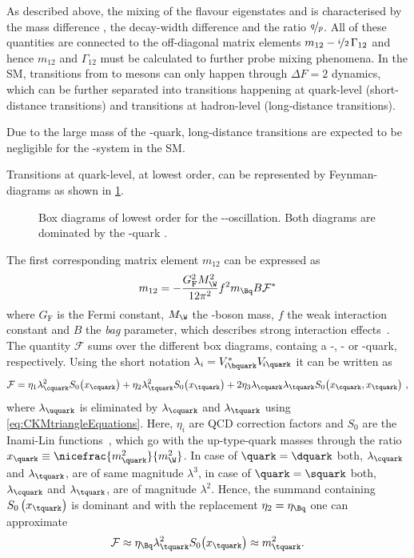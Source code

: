As described above, the mixing of the flavour eigenstates \Bq and \Bqb is characterised by the mass difference \dm, the decay-width difference \DG and the ratio $\nicefrac{q}{p}$.
All of these quantities are connected to the off-diagonal matrix elements $m_{12}-\nicefrac{i}{2}\,\Gamma_{12}$ and hence $m_{12}$ and $\Gamma_{12}$ must be calculated to further probe mixing phenomena.
In the \ac{SM}, transitions from \Bq to \Bqb mesons can only happen through $\Delta F=2$ dynamics, which can be further separated into transitions happening at quark-level (short-distance transitions) and transitions at hadron-level (long-distance transitions).

Due to the large mass of the \bquark-quark, long-distance transitions are expected to be negligible for the \Bq-\Bqb system in the \ac{SM}.

Transitions at quark-level, at lowest order, can be represented by Feynman-diagrams as shown in \cref{fig:FeynmanMixing}.
\begin{figure}[tbp]
	\centering
	
	\hspace{0.5cm}
	
	\caption{Box diagrams of lowest order for the \Bz-\Bzb-oscillation. Both diagrams are dominated by the \tquark-quark \cite{Ellis:2016jkw}.}
	\label{fig:FeynmanMixing}
\end{figure}
The first corresponding matrix element $m_{12}$ can be expressed as
\begin{equation}
m_{12}=-\frac{G_{\text{F}}^2M_\W^2}{12\pi^2}f^2m_{\Bq}B\mathcal{F}^\ast \label{eq:monetwo}
\end{equation}
where $G_{\text{F}}$ is the Fermi constant, $M_\W$ the \W-boson mass, $f$ the weak interaction constant and $B$ the \emph{bag} parameter, which describes strong interaction effects~\cite{Branco:396964}.
The quantity $\mathcal{F}$ sums over the different box diagrams, containg a \uquark-, \cquark- or \tquark-quark, respectively.
Using the short notation $\lambda_i=V^{*}_{{\kern -0.1em}i\bquark}V_{{\kern -0.1em}i\quark}$ it can be written as
\begin{equation}
\mathcal{F}=\eta_1\lambda_\cquark^2S_0\!\left(x_\cquark\right)+\eta_2\lambda_\tquark^2S_0\!\left(x_\tquark\right)
+2\eta_3\lambda_{\cquark}\lambda_{\tquark}S_0\!\left(x_\cquark,x_\tquark\right)\,,
\end{equation}
where $\lambda_\uquark$ is eliminated by $\lambda_\cquark$ and $\lambda_\tquark$ using \cref{eq:CKMtriangleEquations}.
Here, $\eta_i$ are QCD correction factors and $S_0$ are the Inami-Lin functions~\cite{Inami:1980fz}, which go with the up-type-quark masses through the ratio $x_\quark\equiv\nicefrac{m_\quark^2}{m_\W^2}$.
In case of $\quark=\dquark$ both, $\lambda_\cquark$ and $\lambda_\tquark$, are of same magnitude $\lambda^3$, in case of $\quark=\squark$ both, $\lambda_\cquark$ and $\lambda_\tquark$, are of magnitude $\lambda^2$.
Hence, the summand containing $S_0\left(x_\tquark\right)$ is dominant and with the replacement $\eta_2=\eta_\Bq$ one can approximate
\begin{equation}
\mathcal{F}\approx\eta_\Bq\lambda_\tquark^2S_0\!\left(x_\tquark\right)\approx m_\tquark^2.
\end{equation}

